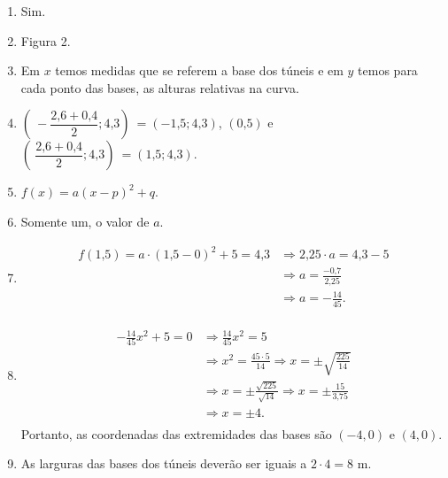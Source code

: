 \documentclass[10 pt,usenames,dvipsnames, oneside]{article}
\begin{document}
\ifdefined\prof
\begin{solucao}

\begin{enumerate}
\item {} 
Sim.

\item {} 
Figura 2.

\item {} 
Em \(x\) temos medidas que se referem a base dos túneis e em \(y\) temos para cada ponto das bases, as alturas relativas na curva.

\item {} 
\((\ -\dfrac{2\text{,}6+0\text{,}4}{2};4\text{,}3)\ = (-1\text{,}5;4\text{,}3)\), \((0\text{,}5)\) e \((\ \dfrac{2\text{,}6+0\text{,}4}{2};4\text{,}3)\ = (1\text{,}5;4\text{,}3)\).

\item {} 
\(f(x)=a(x-p)^2+q\).

\item {} 
Somente um, o valor de \(a\).

\item {} \begin{equation*}
\begin{split}f(1\text{,}5)= a \cdot (1\text{,}5-0)^2+5=4\text{,}3 
      & \Rightarrow 2\text{,}25 \cdot a = 4\text{,}3-5 \\
      & \Rightarrow a = \frac{-0\text{,}7}{2\text{,}25} \\
      & \Rightarrow a = - \frac{14}{45}. \\\end{split}
\end{equation*}
\item {} \begin{equation*}
\begin{split}- \frac{14}{45} x^2 + 5 = 0 & \Rightarrow \frac{14}{45} x^2 = 5 \\
& \Rightarrow x^2 = \frac{45 \cdot 5}{14} \Rightarrow x= \pm \sqrt{\frac{225}{14}} \\
& \Rightarrow x = \pm \frac{\sqrt{225}}{\sqrt{14}} \Rightarrow x = \pm \frac{15}{3\text{,}75} \\
& \Rightarrow x = \pm 4. \\\end{split}
\end{equation*}
Portanto, as coordenadas das extremidades das bases são \((-4,0)\) e \((4,0)\).

\item {} 
As larguras das bases dos túneis deverão ser iguais a \(2 \cdot 4 = 8\) m.

\end{enumerate}

\end{solucao}
\fi
\end{document}
